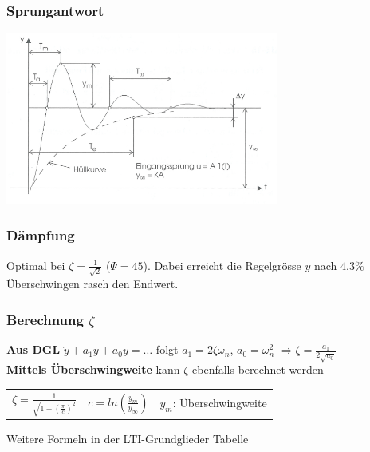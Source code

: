   \begin{multicols}{2}
	\subsubsection{Sprungantwort}
	\includegraphics[width = 9cm]{./images/pt2StepResp}
	
	\subsubsection{Dämpfung}
	Optimal bei $\zeta=\frac{1}{\sqrt{2}}$ ($\Psi=45$).
	Dabei erreicht die Regelgrösse $y$ nach $4.3\%$ Überschwingen rasch den	Endwert.
		
    \subsubsection{Berechnung $\zeta$}
     \textbf{Aus DGL} $\ddot{y}+a_1\dot{y}+a_0 y=\ldots$ folgt $a_1=2\zeta\omega_n$, 
      $a_0=\omega_n^2$
      $\Rightarrow \zeta=\frac{a_1}{2\sqrt{a_0}}$ \\
      \textbf{Mittels Überschwingweite} kann $\zeta$ ebenfalls berechnet werden\\
      \begin{tabular}{p{2.5cm}p{2.5cm}p{4cm}}
        $\zeta = \frac{1}{\sqrt{1+(\frac{\pi}{c})^2}}$ & $c =ln(\frac{y_m}{y_{\infty}})$ & $y_m$: Überschwingweite
      \end{tabular}

		Weitere Formeln in der LTI-Grundglieder Tabelle
  \end{multicols}
  
